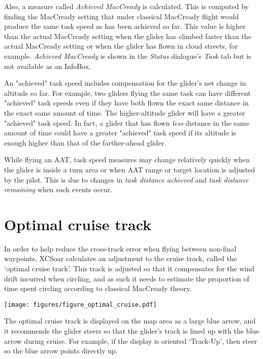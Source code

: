 Also, a measure called \emph{Achieved MacCready} is calculated.
This is computed by finding the MacCready setting that under classical
MacCready flight would produce the same task speed as has been
achieved so far.  This value is higher than the actual MacCready setting when
the glider has climbed faster than the actual MacCready setting or when the
glider has flown in cloud streets, for example.  \emph{Achieved MacCready} is 
shown in the \emph{Status} dialogue's \emph{Task} tab but is not available as 
an InfoBox.

An "achieved" task speed includes compensation for the glider's net change in 
altitude so far.  For example, two gliders flying the same task can have
different "achieved" task speeds even if they have both flown the exact same
distance in the exact same amount of time.  The higher-altitude glider will
have a greater "achieved" task speed.  In fact, a glider that has flown 
\emph{less} distance in the same amount of time could have a greater 
"achieved" task speed if its altitude is enough higher than that of the
farther-ahead glider.

While flying an AAT, task speed measures may change relatively quickly when 
the glider is inside a turn area or when AAT range or target location is
adjusted by the pilot.  This is due to changes in \emph{task distance 
achieved} and \emph{task distance remaining} when such events occur.


\section{Optimal cruise track}

In order to help reduce the cross-track error when flying between
non-final waypoints, XCSoar calculates an adjustment to the cruise
track, called the `optimal cruise track'.  This track is adjusted so
that it compensates for the wind drift incurred when circling, and as
such it needs to estimate the proportion of time spent circling
according to classical MacCready theory.

\begin{center}
\begin{maxipage}
\centering
\def\svgwidth{0.8\linewidth}
\texttt{[image: figures/figure\_optimal\_cruise.pdf]}
\end{maxipage}
\end{center}

The optimal cruise track is displayed on the map area as a large blue
arrow, and it recommends the glider steers so that the glider's track
is lined up with the blue arrow during cruise.  For example, if the
display is oriented `Track-Up', then steer so the blue arrow points
directly up.

